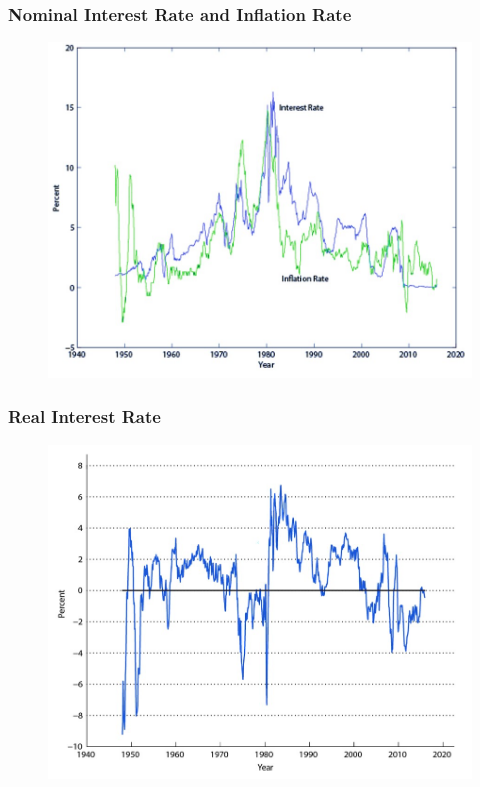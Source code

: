 \documentclass{beamer}
\begin{document}
\begin{frame}
\frametitle[alignment=center]{Nominal Interest Rate and Inflation Rate}
\begin{figure}
\includegraphics[scale=0.6]{Figures/W_Fig_1pt11.png}
\end{figure}
\end{frame}

\begin{frame}
\frametitle[alignment=center]{Real Interest Rate}
\begin{figure}
\includegraphics[scale=0.6]{Figures/W_Fig_1pt12.png}
\end{figure}
\end{frame}
\end{document}
